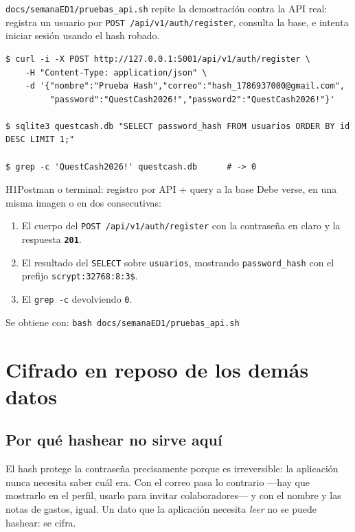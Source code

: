 \documentclass[11pt,letterpaper]{article}
\newcommand{\http}[2]{\textcolor{#1}{\texttt{\textbf{#2}}}}
\begin{document}
\texttt{docs/semanaED1/pruebas\_api.sh} repite la demostración contra la API
real: registra un usuario por \texttt{POST /api/v1/auth/register}, consulta la
base, e intenta iniciar sesión usando el hash robado.

\begin{lstlisting}[style=terminal]
$ curl -i -X POST http://127.0.0.1:5001/api/v1/auth/register \
    -H "Content-Type: application/json" \
    -d '{"nombre":"Prueba Hash","correo":"hash_1786937000@gmail.com",
         "password":"QuestCash2026!","password2":"QuestCash2026!"}'

$ sqlite3 questcash.db "SELECT password_hash FROM usuarios ORDER BY id DESC LIMIT 1;"

$ grep -c 'QuestCash2026!' questcash.db      # -> 0
\end{lstlisting}

\begin{captura}{H1}{Postman o terminal: registro por API + query a la base}
\vspace{2.4cm}
\footnotesize
Debe verse, en una misma imagen o en dos consecutivas:
\begin{enumerate}[leftmargin=1.3em,itemsep=1pt,topsep=2pt]
  \item El cuerpo del \texttt{POST /api/v1/auth/register} con la contraseña en
        claro y la respuesta \http{qcGreen}{201}.
  \item El resultado del \texttt{SELECT} sobre \texttt{usuarios}, mostrando
        \texttt{password\_hash} con el prefijo \texttt{scrypt:32768:8:3\$}.
  \item El \texttt{grep -c} devolviendo \texttt{0}.
\end{enumerate}
Se obtiene con: \texttt{bash docs/semanaED1/pruebas\_api.sh}
\vspace{2.4cm}
\end{captura}

\section{Cifrado en reposo de los demás datos}
\label{sec:cifrado}

\subsection{Por qué hashear no sirve aquí}

El hash protege la contraseña precisamente porque es irreversible: la
aplicación nunca necesita saber cuál era. Con el correo pasa lo contrario —hay
que mostrarlo en el perfil, usarlo para invitar colaboradores— y con el nombre
y las notas de gastos, igual. Un dato que la aplicación necesita \emph{leer}
no se puede hashear: se cifra.
\end{document}
